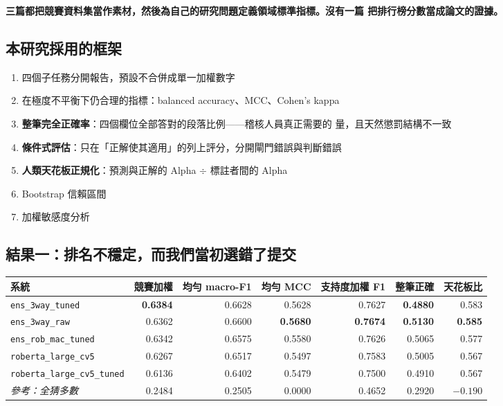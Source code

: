 \documentclass[11pt,a4paper]{ctexart}
\newcommand{\fn}[1]{\texttt{#1}}
\begin{document}
\textbf{三篇都把競賽資料集當作素材，然後為自己的研究問題定義領域標準指標。沒有一篇
把排行榜分數當成論文的證據。}

\subsection{本研究採用的框架}

\begin{enumerate}[leftmargin=2em, itemsep=1pt]
  \item 四個子任務分開報告，預設不合併成單一加權數字
  \item 在極度不平衡下仍合理的指標：balanced accuracy、MCC、Cohen's kappa
  \item \textbf{整筆完全正確率}：四個欄位全部答對的段落比例——稽核人員真正需要的
        量，且天然懲罰結構不一致
  \item \textbf{條件式評估}：只在「正解使其適用」的列上評分，分開閘門錯誤與判斷錯誤
  \item \textbf{人類天花板正規化}：預測與正解的 Alpha $\div$ 標註者間的 Alpha
  \item Bootstrap 信賴區間
  \item 加權敏感度分析
\end{enumerate}

\subsection{結果一：排名不穩定，而我們當初選錯了提交}

\begin{table}[h]
\centering\small
\begin{tabular}{@{}lrrrrrr@{}}
\toprule
系統 & 競賽加權 & 均勻 macro-F1 & 均勻 MCC & 支持度加權 F1 & 整筆正確 & 天花板比 \\
\midrule
\fn{ens\_3way\_tuned} & \textbf{0.6384} & 0.6628 & 0.5628 & 0.7627 & \textbf{0.4880} & 0.583 \\
\fn{ens\_3way\_raw}   & 0.6362 & 0.6600 & \textbf{0.5680} & \textbf{0.7674} & \textbf{0.5130} & \textbf{0.585} \\
\fn{ens\_rob\_mac\_tuned} & 0.6342 & 0.6575 & 0.5580 & 0.7626 & 0.5065 & 0.577 \\
\fn{roberta\_large\_cv5} & 0.6267 & 0.6517 & 0.5497 & 0.7583 & 0.5005 & 0.567 \\
\fn{roberta\_large\_cv5\_tuned} & 0.6136 & 0.6402 & 0.5479 & 0.7500 & 0.4910 & 0.567 \\
\textit{參考：全猜多數} & 0.2484 & 0.2505 & 0.0000 & 0.4652 & 0.2920 & $-0.190$ \\
\bottomrule
\end{tabular}
\end{table}
\end{document}
